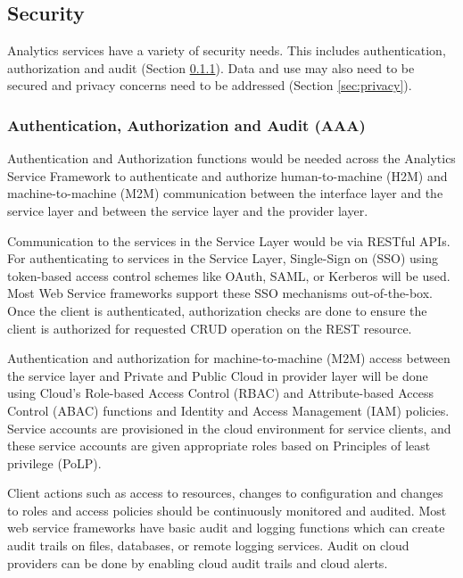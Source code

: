 
\subsection{Security}
\label{sec:security}

Analytics services have a variety of security needs. This includes authentication, authorization and audit (Section \ref{sec:aaa}). Data and use may also need to be secured and privacy concerns need to be addressed (Section \ref{sec:privacy}).

\subsubsection{Authentication, Authorization and Audit (AAA)}\label{sec:aaa}

Authentication and Authorization functions would be needed across the Analytics Service Framework to authenticate and authorize human-to-machine (H2M) and machine-to-machine (M2M) communication between the interface layer and the service layer and between the service layer and the provider layer.

Communication to the services in the Service Layer would be via RESTful APIs. For authenticating to services in the Service Layer, Single-Sign on (SSO) using token-based access control schemes like OAuth, SAML, or Kerberos will be used. Most Web Service frameworks support these SSO mechanisms out-of-the-box. Once the client is authenticated, authorization checks are done to ensure the client is authorized for requested CRUD operation on the REST resource.

Authentication and authorization for machine-to-machine (M2M) access between the service layer and Private and Public Cloud in provider layer will be done using Cloud's Role-based Access Control (RBAC) and Attribute-based Access Control (ABAC) functions and Identity and Access Management (IAM) policies. Service accounts are provisioned in the cloud environment for service clients, and these service accounts are given appropriate roles based on Principles of least privilege (PoLP).

Client actions such as access to resources, changes to configuration and changes to roles and access policies should be continuously monitored and audited. Most web service frameworks have basic audit and logging functions which can create audit trails on files, databases, or remote logging services. Audit on cloud providers can be done by enabling cloud audit trails and cloud alerts.

